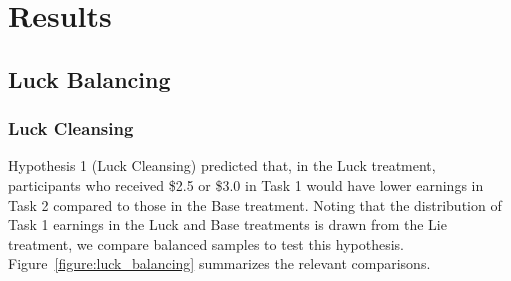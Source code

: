\documentclass{article}
\begin{document}
\section{Results} \label{results}

\subsection{Luck Balancing}

\subsubsection{Luck Cleansing}
Hypothesis 1 (Luck Cleansing) predicted that, in the Luck treatment, participants who received \$2.5 or \$3.0 in Task 1 would have lower earnings in Task 2 compared to those in the Base treatment. Noting that the distribution of Task 1 earnings in the Luck and Base treatments is drawn from the Lie treatment, we compare balanced samples to test this hypothesis. Figure~\ref{figure:luck_balancing} summarizes the relevant comparisons.
\end{document}
